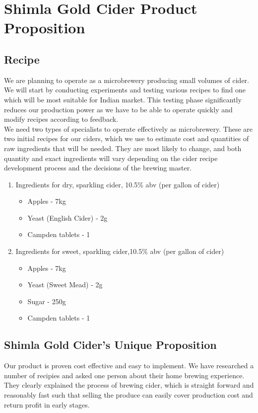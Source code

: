 \documentclass[11pt]{article}
\begin{document}
\section{Shimla Gold Cider Product Proposition}
  \subsection{Recipe}
We are planning to operate as a microbrewery producing small volumes of cider. We will start by conducting experiments and testing various recipes to find one which will be most suitable for Indian market. This testing phase significantly reduces our production power as we have to be able to operate quickly and modify recipes according to feedback.\\

\noindent We need two types of specialists to operate effectively as microbrewery. These are two initial recipes for our ciders, which we use to estimate cost and quantities of raw ingredients that will be needed. They are most likely to change, and both quantity and exact ingredients will vary depending on the cider recipe development process and the decisions of the brewing master.

		\begin{enumerate}
			\item Ingredients for dry, sparkling cider, 10.5\% abv (per gallon of cider)
				\begin{itemize}
					\item Apples - 7kg
					\item Yeast (English Cider) - 2g
					\item Campden tablets - 1
				\end{itemize}

			\item Ingredients for sweet, sparkling cider,10.5\% abv (per gallon of cider)
				\begin{itemize}
					\item Apples - 7kg
					\item Yeast (Sweet Mead) - 2g
					\item Sugar - 250g
					\item Campden tablets - 1
				\end{itemize}
			\end{enumerate}

  \subsection{Shimla Gold Cider's Unique Proposition}
Our product is proven cost effective and easy to implement. We have researched a number of recipies and asked one person about their home brewing experience. They clearly explained the process of brewing cider, which is straight forward and reasonably fast such that selling the produce can easily cover production cost and return profit in early stages.
  
\end{document}
